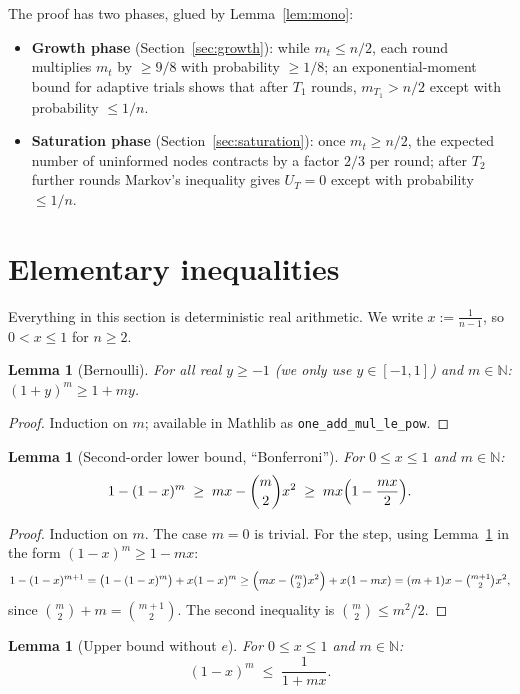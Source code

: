 \documentclass[11pt]{article}
\newtheorem{lemma}[theorem]{Lemma}
\newcommand{\N}{\mathbb{N}}
\begin{document}
The proof has two phases, glued by Lemma~\ref{lem:mono}:
\begin{itemize}[leftmargin=2em]
\item \textbf{Growth phase} (Section~\ref{sec:growth}): while $m_t \le n/2$,
  each round multiplies $m_t$ by $\ge 9/8$ with probability $\ge 1/8$;
  an exponential-moment bound for adaptive trials shows that after $T_1$
  rounds, $m_{T_1} > n/2$ except with probability $\le 1/n$.
\item \textbf{Saturation phase} (Section~\ref{sec:saturation}): once
  $m_t \ge n/2$, the expected number of uninformed nodes contracts by a factor
  $2/3$ per round; after $T_2$ further rounds Markov's inequality gives
  $U_T = 0$ except with probability $\le 1/n$.
\end{itemize}

\section{Elementary inequalities}\label{sec:ineq}

Everything in this section is deterministic real arithmetic.  We write
$x := \tfrac{1}{n-1}$, so $0 < x \le 1$ for $n \ge 2$.

\begin{lemma}[Bernoulli]\label{lem:bernoulli}
For all real $y \ge -1$ (we only use $y\in[-1,1]$) and $m \in \N$:
$(1+y)^m \ge 1 + my$.
\end{lemma}

\begin{proof}
Induction on $m$; available in Mathlib as \texttt{one\_add\_mul\_le\_pow}.
\end{proof}

\begin{lemma}[Second-order lower bound, ``Bonferroni'']\label{lem:bonferroni}
For $0 \le x \le 1$ and $m \in \N$:
\[
  1-(1-x)^m \;\ge\; mx - \binom{m}{2}x^2 \;\ge\; mx\Bigl(1-\frac{mx}{2}\Bigr).
\]
\end{lemma}

\begin{proof}
Induction on $m$. The case $m=0$ is trivial. For the step, using
Lemma~\ref{lem:bernoulli} in the form $(1-x)^m \ge 1-mx$:
\[
  1-(1-x)^{m+1} = \bigl(1-(1-x)^m\bigr) + x(1-x)^m
  \ge \Bigl(mx - \tbinom{m}{2}x^2\Bigr) + x(1-mx)
  = (m+1)x - \tbinom{m+1}{2}x^2 ,
\]
since $\binom{m}{2}+m = \binom{m+1}{2}$. The second inequality is
$\binom{m}{2} \le m^2/2$.
\end{proof}

\begin{lemma}[Upper bound without $e$]\label{lem:upper}
For $0 \le x \le 1$ and $m \in \N$:
\[
  (1-x)^m \;\le\; \frac{1}{1+mx}.
\]
\end{lemma}
\end{document}
